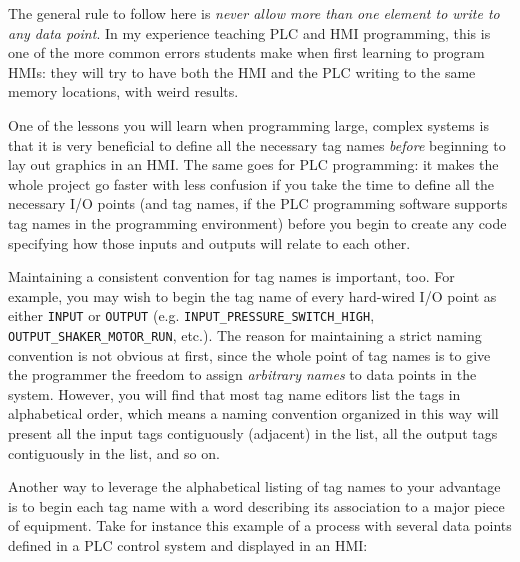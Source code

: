 The general rule to follow here is \textit{never allow more than one element to write to any data point}.  In my experience teaching PLC and HMI programming, this is one of the more common errors students make when first learning to program HMIs: they will try to have both the HMI and the PLC writing to the same memory locations, with weird results.

\vskip 10pt

One of the lessons you will learn when programming large, complex systems is that it is very beneficial to define all the necessary tag names \textit{before} beginning to lay out graphics in an HMI.  The same goes for PLC programming: it makes the whole project go faster with less confusion if you take the time to define all the necessary I/O points (and tag names, if the PLC programming software supports tag names in the programming environment) before you begin to create any code specifying how those inputs and outputs will relate to each other.  

Maintaining a consistent convention for tag names is important, too.  For example, you may wish to begin the tag name of every hard-wired I/O point as either \texttt{INPUT} or \texttt{OUTPUT} (e.g. \texttt{INPUT\_PRESSURE\_SWITCH\_HIGH}, \texttt{OUTPUT\_SHAKER\_MOTOR\_RUN}, etc.).  The reason for maintaining a strict naming convention is not obvious at first, since the whole point of tag names is to give the programmer the freedom to assign \textit{arbitrary names} to data points in the system.  However, you will find that most tag name editors list the tags in alphabetical order, which means a naming convention organized in this way will present all the input tags contiguously (adjacent) in the list, all the output tags contiguously in the list, and so on.    

\filbreak

Another way to leverage the alphabetical listing of tag names to your advantage is to begin each tag name with a word describing its association to a major piece of equipment.  Take for instance this example of a process with several data points defined in a PLC control system and displayed in an HMI:

